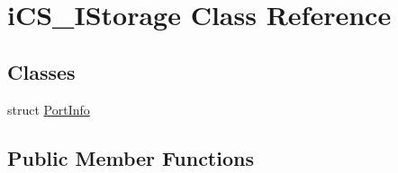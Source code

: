 \hypertarget{classi_c_s___i_storage}{\section{i\+C\+S\+\_\+\+I\+Storage Class Reference}
\label{classi_c_s___i_storage}
}
\subsection*{Classes}
\begin{DoxyCompactItemize}
\item 
struct \hyperlink{structi_c_s___i_storage_1_1_port_info}{Port\+Info}
\end{DoxyCompactItemize}
\subsection*{Public Member Functions}
